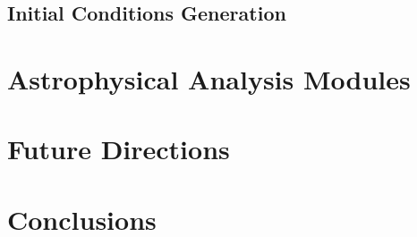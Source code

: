 \documentclass{emulateapj}
\begin{document}
\subsection{Initial Conditions Generation}


\section{Astrophysical Analysis Modules}


\section{Future Directions}


\section{Conclusions}\label{sec:conclusions}


\acknowledgments 



\end{document}
